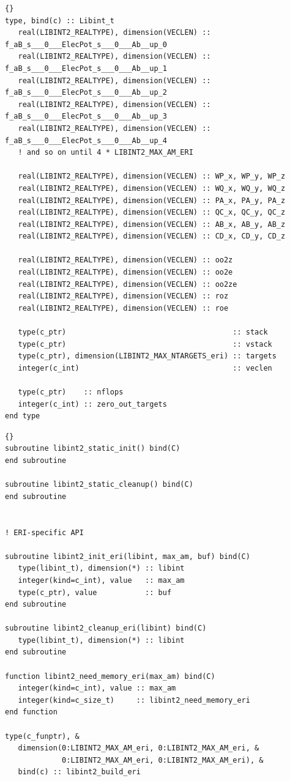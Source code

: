 \documentclass[10pt]{article}
\begin{document}
\begin{lstlisting}[label=lst:libinttf,caption=Fortran definition of the \LIBINT\ integral evaluator type.]{}
type, bind(c) :: Libint_t
   real(LIBINT2_REALTYPE), dimension(VECLEN) :: f_aB_s___0___ElecPot_s___0___Ab__up_0
   real(LIBINT2_REALTYPE), dimension(VECLEN) :: f_aB_s___0___ElecPot_s___0___Ab__up_1
   real(LIBINT2_REALTYPE), dimension(VECLEN) :: f_aB_s___0___ElecPot_s___0___Ab__up_2
   real(LIBINT2_REALTYPE), dimension(VECLEN) :: f_aB_s___0___ElecPot_s___0___Ab__up_3
   real(LIBINT2_REALTYPE), dimension(VECLEN) :: f_aB_s___0___ElecPot_s___0___Ab__up_4
   ! and so on until 4 * LIBINT2_MAX_AM_ERI

   real(LIBINT2_REALTYPE), dimension(VECLEN) :: WP_x, WP_y, WP_z
   real(LIBINT2_REALTYPE), dimension(VECLEN) :: WQ_x, WQ_y, WQ_z
   real(LIBINT2_REALTYPE), dimension(VECLEN) :: PA_x, PA_y, PA_z
   real(LIBINT2_REALTYPE), dimension(VECLEN) :: QC_x, QC_y, QC_z
   real(LIBINT2_REALTYPE), dimension(VECLEN) :: AB_x, AB_y, AB_z
   real(LIBINT2_REALTYPE), dimension(VECLEN) :: CD_x, CD_y, CD_z

   real(LIBINT2_REALTYPE), dimension(VECLEN) :: oo2z
   real(LIBINT2_REALTYPE), dimension(VECLEN) :: oo2e
   real(LIBINT2_REALTYPE), dimension(VECLEN) :: oo2ze
   real(LIBINT2_REALTYPE), dimension(VECLEN) :: roz
   real(LIBINT2_REALTYPE), dimension(VECLEN) :: roe

   type(c_ptr)                                      :: stack
   type(c_ptr)                                      :: vstack
   type(c_ptr), dimension(LIBINT2_MAX_NTARGETS_eri) :: targets
   integer(c_int)                                   :: veclen

   type(c_ptr)    :: nflops
   integer(c_int) :: zero_out_targets
end type
\end{lstlisting}

\begin{lstlisting}[label=lst:apif,caption=\LIBINT\ Fortran API procedures and data.]{}
subroutine libint2_static_init() bind(C)
end subroutine

subroutine libint2_static_cleanup() bind(C)
end subroutine


! ERI-specific API

subroutine libint2_init_eri(libint, max_am, buf) bind(C)
   type(libint_t), dimension(*) :: libint
   integer(kind=c_int), value   :: max_am
   type(c_ptr), value           :: buf
end subroutine

subroutine libint2_cleanup_eri(libint) bind(C)
   type(libint_t), dimension(*) :: libint
end subroutine

function libint2_need_memory_eri(max_am) bind(C)
   integer(kind=c_int), value :: max_am
   integer(kind=c_size_t)     :: libint2_need_memory_eri
end function

type(c_funptr), &
   dimension(0:LIBINT2_MAX_AM_eri, 0:LIBINT2_MAX_AM_eri, &
             0:LIBINT2_MAX_AM_eri, 0:LIBINT2_MAX_AM_eri), &
   bind(c) :: libint2_build_eri
\end{lstlisting}
\end{document}
